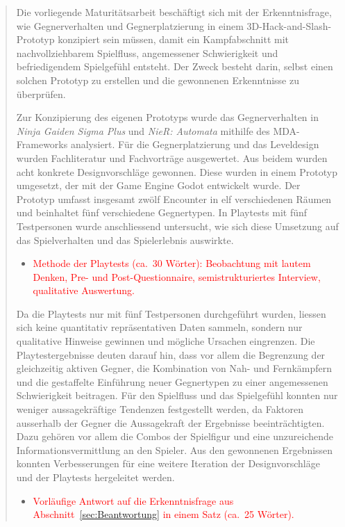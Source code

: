 \documentclass[10pt]{article}
\newcommand{\game}[1]{\textit{#1}}   %
\begin{document}
\begin{abstract}
    Die vorliegende Maturitätsarbeit beschäftigt sich mit der Erkenntnisfrage, wie Gegnerverhalten und Gegnerplatzierung in einem 3D-Hack-and-Slash-Prototyp konzipiert sein müssen, damit ein Kampfabschnitt mit nachvollziehbarem Spielfluss, angemessener Schwierigkeit und befriedigendem Spielgefühl entsteht. Der Zweck besteht darin, selbst einen solchen Prototyp zu erstellen und die gewonnenen Erkenntnisse zu überprüfen.

    Zur Konzipierung des eigenen Prototyps wurde das Gegnerverhalten in \game{Ninja Gaiden Sigma Plus} und \game{NieR: Automata} mithilfe des MDA-Frameworks analysiert. Für die Gegnerplatzierung und das Leveldesign wurden Fachliteratur und Fachvorträge ausgewertet. Aus beidem wurden acht konkrete Designvorschläge gewonnen. Diese wurden in einem Prototyp umgesetzt, der mit der Game Engine Godot entwickelt wurde. Der Prototyp umfasst insgesamt zwölf Encounter in elf verschiedenen Räumen und beinhaltet fünf verschiedene Gegnertypen. In Playtests mit fünf Testpersonen wurde anschliessend untersucht, wie sich diese Umsetzung auf das Spielverhalten und das Spielerlebnis auswirkte.

    \begin{itemize}[nosep, leftmargin=*]
        \item \textcolor{red}{Methode der Playtests (ca.\ 30 Wörter): Beobachtung mit lautem Denken, Pre- und Post-Questionnaire, semistrukturiertes Interview, qualitative Auswertung.}
    \end{itemize}

    Da die Playtests nur mit fünf Testpersonen durchgeführt wurden, liessen sich keine quantitativ repräsentativen Daten sammeln, sondern nur qualitative Hinweise gewinnen und mögliche Ursachen eingrenzen. Die Playtestergebnisse deuten darauf hin, dass vor allem die Begrenzung der gleichzeitig aktiven Gegner, die Kombination von Nah- und Fernkämpfern und die gestaffelte Einführung neuer Gegnertypen zu einer angemessenen Schwierigkeit beitragen. Für den Spielfluss und das Spielgefühl konnten nur weniger aussagekräftige Tendenzen festgestellt werden, da Faktoren ausserhalb der Gegner die Aussagekraft der Ergebnisse beeinträchtigten. Dazu gehören vor allem die Combos der Spielfigur und eine unzureichende Informationsvermittlung an den Spieler. Aus den gewonnenen Ergebnissen konnten Verbesserungen für eine weitere Iteration der Designvorschläge und der Playtests hergeleitet werden.

    \begin{itemize}[nosep, leftmargin=*]
        \item \textcolor{red}{Vorläufige Antwort auf die Erkenntnisfrage aus Abschnitt~\ref{sec:Beantwortung} in einem Satz (ca.\ 25 Wörter).}
    \end{itemize}
\end{abstract}
\end{document}
